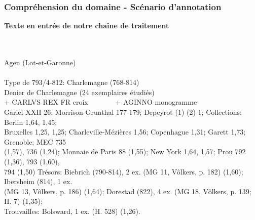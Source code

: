 \documentclass[10pt, compress]{beamer}
\begin{document}
\begin{frame}[fragile]
	\frametitle{Compréhension du domaine - Scénario d'annotation}

	\textbf{Texte en entrée de notre chaîne de traitement}\\~\\~\\
\begin{scriptsize}
Agen (Lot-et-Garonne)\\~\\

Type de 793/4-812: Charlemagne (768-814)\\
Denier de Charlemagne (24 exemplaires étudiés)\\
+ CARLVS REX FR croix~~~~~~~ + AGINNO monogramme\\
Gariel XXII 26; Morrison-Grunthal 177-179; Depeyrot (1) (2) 1; Collections: Berlin 1,64, 1,45;\\
Bruxelles 1,25, 1,25; Charleville-Mézières 1,56; Copenhague 1,31; Garett 1,73; Grenoble; MEC 735 \\
(1,57), 736 (1,24); Monnaie de Paris 88 (1,55); New York 1,64, 1,57; Prou 792 (1,36), 793 (1,60), \\
794 (1,50) Trésors: Biebrich (790-814), 2 ex. (MG 11, Vôlkers, p. 182) (1,60); Ibersheim (814), 1 ex. \\
(MG 13, Vôlkers, p. 186) (1,64); Dorestad (822), 4 ex. (MG 18, Vôlkers, p. 139; H. 7) (1,35);\\
Trouvailles: Bolsward, 1 ex. (H. 528) (1,26).
\end{scriptsize}

\end{frame}
\end{document}
